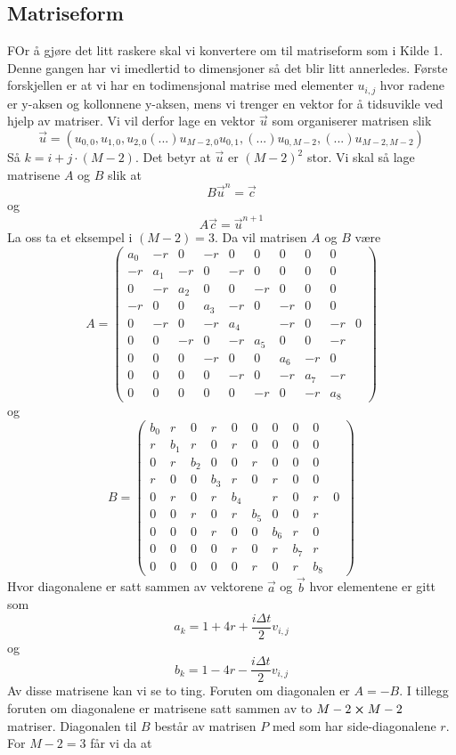 \documentclass[reprint,english,notitlepage]{revtex4-2}  %
\begin{document}
\subsection{Matriseform}
FOr å gjøre det litt raskere skal vi konvertere om til matriseform som i Kilde 1. Denne gangen har vi imedlertid to dimensjoner så det blir litt annerledes. Første forskjellen er at vi har en todimensjonal matrise med elementer $u_{i,j}$ hvor radene er y-aksen og kollonnene y-aksen, mens vi trenger en vektor for å tidsuvikle ved hjelp av matriser. Vi vil derfor lage en vektor $\vec{u}$ som organiserer matrisen slik
$$
\vec{u}=(u_{0,0}, u_{1,0}, u_{2,0} (...) u_{M-2, 0} u_{0,1},(...) u_{0, M-2}, (...) u_{M-2, M-2})
$$
Så $k=i+j\cdot (M-2)$. Det betyr at $\vec{u}$ er $(M-2)^2$ stor.
\newline 
Vi skal så lage matrisene $A$ og $B$ slik at
$$
B\vec{u}^n=\vec{c}
$$
og
$$
A\vec{c}=\vec{u}^{n+1}
$$
La oss ta et eksempel i $(M-2)=3$. Da vil matrisen $A$ og $B$ være
$$
A=\begin{pmatrix}
	a_0 & -r & 0 & -r & 0 &0&0&0&0 \\
	-r & a_1 & -r & 0 & -r& 0&0&0&0 \\
	0 &-r &a_2&0&0&-r&0&0&0 \\
	-r &0&0&a_3&-r&0&-r&0&0 \\
	0&-r&0&-r&a_4&&-r&0&-r&0 \\
	0&0&-r&0&-r&a_5&0&0&-r \\
	0&0&0&-r&0&0&a_6&-r&0 \\
	0&0&0&0&-r&0&-r&a_7&-r \\
	0&0&0&0&0&-r&0&-r&a_8
\end{pmatrix}
$$
og
$$
B=\begin{pmatrix}
	b_0 & r & 0 & r & 0 &0&0&0&0 \\
	r & b_1 & r & 0 & r& 0&0&0&0 \\
	0 &r &b_2&0&0&r&0&0&0 \\
	r &0&0&b_3&r&0&r&0&0 \\
	0&r&0&r&b_4&&r&0&r&0 \\
	0&0&r&0&r&b_5&0&0&r \\
	0&0&0&r&0&0&b_6&r&0 \\
	0&0&0&0&r&0&r&b_7&r \\
	0&0&0&0&0&r&0&r&b_8
\end{pmatrix}
$$
Hvor diagonalene er satt sammen av vektorene $\vec{a}$ og $\vec{b}$ hvor elementene er gitt som
$$
a_k=1+4r+\frac{i\Delta t}{2}v_{i,j}
$$
og
$$
b_k=1-4r-\frac{i\Delta t}{2}v_{i,j}
$$
Av disse matrisene kan vi se to ting. Foruten om diagonalen er $A=-B$. I tillegg foruten om diagonalene er matrisene satt sammen av to $M-2 \cross M-2$ matriser. Diagonalen til $B$ består av matrisen $P$ med som har side-diagonalene $r$. For $M-2=3$ får vi da at
\end{document}
